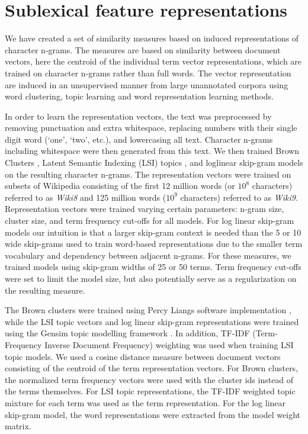 \section{Sublexical feature representations}
\label{subrep-features}

We have created a set of similarity measures based on induced representations of character n-grams. The measures are based on similarity between document vectors, here the centroid of the individual term vector representations, which are trained on character n-grams rather than full words. The vector representation are induced in an unsupervised manner from large unannotated corpora using word clustering, topic learning and word representation learning methods.

In order to learn the representation vectors, the text was preprocessed by removing punctuation and extra whitespace, replacing numbers with their single digit word (`one', `two', etc.), and lowercasing all text. Character n-grams including whitespace were then generated from this text. We then trained Brown Clusters \cite{brown1992class}, Latent Semantic Indexing (LSI) topics \cite{deerwester1990indexing}, and loglinear skip-gram models \cite{mikolov2013efficient} on the resulting character n-grams. The representation vectors were trained on subsets of Wikipedia consisting of the first 12 million words (or $10^8$ characters) referred to as {\it Wiki8} and 125 million words ($10^9$ characters) referred to as {\it Wiki9}. 
Representation vectors were trained varying certain parameters: n-gram size, cluster size, and term frequency cut-offs for all models.
For log linear skip-gram models our intuition is that a larger skip-gram context is needed than the 5 or 10 wide skip-grams 
used to train word-based representations due to the smaller term vocabulary and dependency between adjacent n-grams.
 For these measures, we trained models using skip-gram widths of 25 or 50 terms. 
Term frequency cut-offs were set to limit the model size, but also potentially serve as a regularization on the resulting measure.

The Brown clusters were trained using Percy Liangs software implementation \cite{liang2005semi}, while the LSI topic vectors and log linear skip-gram representations were trained using the Gensim topic modelling framework \cite{gensim_lrec}. 
In addition, TF-IDF (Term-Frequency Inverse Document Frequency) weighting was used when training LSI topic models. 
We used a cosine distance measure between document vectors consisting of the centroid of the term representation vectors. 
For Brown clusters, the normalized term frequency vectors were used with the cluster ids instead of the terms themselves. 
For LSI topic representations, the TF-IDF weighted topic mixture for each term was used as the term representation. 
For the log linear skip-gram model, the word representations were extracted from the model weight matrix.

